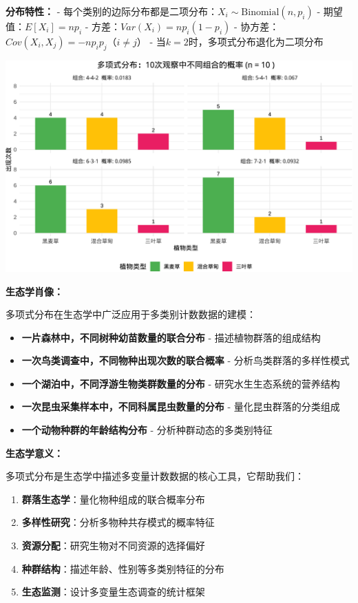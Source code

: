 \documentclass[
]{book}
\providecommand{\tightlist}{%
  \setlength{\itemsep}{0pt}\setlength{\parskip}{0pt}}
\begin{document}
\textbf{分布特性：}
- 每个类别的边际分布都是二项分布：\(X_i \sim \text{Binomial}(n, p_i)\)
- 期望值：\(E[X_i] = np_i\)
- 方差：\(Var(X_i) = np_i(1-p_i)\)
- 协方差：\(Cov(X_i, X_j) = -np_i p_j\)（\(i \neq j\)）
- 当\(k=2\)时，多项式分布退化为二项分布

\begin{center}\includegraphics[width=0.8\linewidth]{ecological-statistics_files/figure-latex/unnamed-chunk-22-1} \end{center}

\textbf{生态学肖像：}

多项式分布在生态学中广泛应用于多类别计数数据的建模：

\begin{itemize}
\tightlist
\item
  \textbf{一片森林中，不同树种幼苗数量的联合分布} - 描述植物群落的组成结构
\item
  \textbf{一次鸟类调查中，不同物种出现次数的联合概率} - 分析鸟类群落的多样性模式
\item
  \textbf{一个湖泊中，不同浮游生物类群数量的分布} - 研究水生生态系统的营养结构
\item
  \textbf{一次昆虫采集样本中，不同科属昆虫数量的分布} - 量化昆虫群落的分类组成
\item
  \textbf{一个动物种群的年龄结构分布} - 分析种群动态的多类别特征
\end{itemize}

\textbf{生态学意义：}

多项式分布是生态学中描述多变量计数数据的核心工具，它帮助我们：

\begin{enumerate}
\def\labelenumi{\arabic{enumi}.}
\tightlist
\item
  \textbf{群落生态学}：量化物种组成的联合概率分布
\item
  \textbf{多样性研究}：分析多物种共存模式的概率特征
\item
  \textbf{资源分配}：研究生物对不同资源的选择偏好
\item
  \textbf{种群结构}：描述年龄、性别等多类别特征的分布
\item
  \textbf{生态监测}：设计多变量生态调查的统计框架
\end{enumerate}
\end{document}
